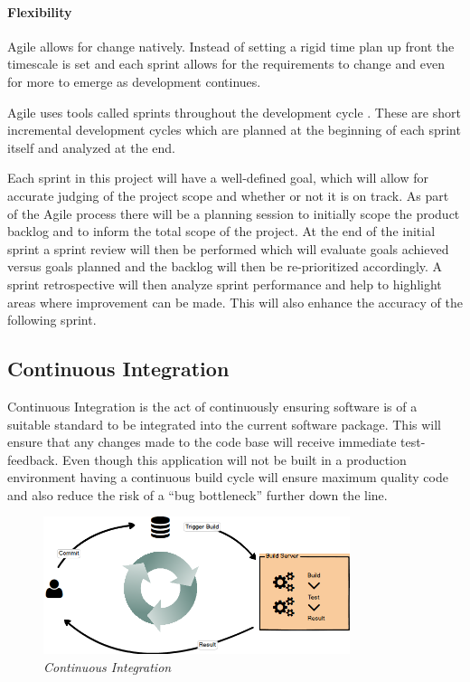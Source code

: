 \paragraph{Flexibility} Agile allows for change natively. Instead of setting a rigid time plan up front the timescale is set and each sprint allows for the requirements to change and even for more to emerge as development continues.

Agile uses tools called sprints throughout the development cycle \citep{Agile2016}. These are short incremental development cycles which are planned at the beginning of each sprint itself and analyzed at the end.

Each sprint in this project will have a well-defined goal, which will allow for accurate judging of the project scope and whether or not it is on track. As part of the Agile process there will be a planning session to initially scope the product backlog and to inform the total scope of the project. At the end of the initial sprint a sprint review will then be performed which will evaluate goals achieved versus goals planned and the backlog will then be re-prioritized accordingly. A sprint retrospective will then analyze sprint performance and help to highlight areas where improvement can be made. This will also enhance the accuracy of the following sprint.

\subsection{Continuous Integration}
Continuous Integration is the act of continuously ensuring software is of a suitable standard to be integrated into the current software package. This will ensure that any changes made to the code base will receive immediate test-feedback. Even though this application will not be built in a production environment having a continuous build cycle will ensure maximum quality code and also reduce the risk of a ``bug bottleneck'' further down the line.

\begin{figure}[!h]
\centering
\includegraphics*[width=0.8\textwidth]{images/CI}
\caption{\em Continuous Integration}
\label{fig:CI}
\end{figure}

